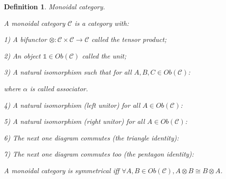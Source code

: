 \documentclass[a4paper]{article}
\newtheorem{defin}{Definition}
\begin{document}
\begin{defin} Monoidal category.

A monoidal category $\mathcal{C}$ is a category with:

1) A bifunctor $\otimes : \mathcal{C} \times \mathcal{C} \to \mathcal{C}$ called the tensor product;

2) An object $\mathds{1} \in Ob(\mathcal{C})$ called the unit;

3) A natural isomorphism such that for all $A, B, C \in Ob(\mathcal{C})$:


where $\alpha$ is called associator.

4) A natural isomorphism (left unitor) for all $A \in Ob(\mathcal{C})$:


5) A natural isomorphism (right unitor) for all $A \in Ob(\mathcal{C})$:


\vspace{\baselineskip}

6) The next one diagram commutes (the triangle identity):

\vspace{\baselineskip}


\vspace{\baselineskip}

7) The next one diagram commutes too (the pentagon identity):

\vspace{\baselineskip}


\vspace{\baselineskip}

A monoidal category is symmetrical iff $\forall A, B \in Ob(\mathcal{C}), A \otimes B \cong B \otimes
A$.
\end{defin}
\end{document}
